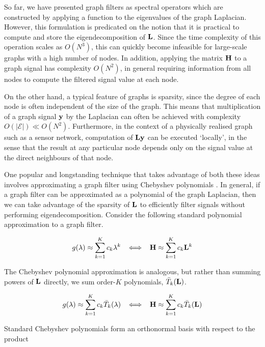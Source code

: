 \label{sec:Chebyshev}

So far, we have presented graph filters as spectral operators which are constructed by applying a function to the eigenvalues of the graph Laplacian. However, this formulation is predicated on the notion that it is practical to compute and store the eigendecomposition of $\mathbf{L}$. Since the time complexity of this operation scales as $O(N^3)$, this can quickly become infeasible for large-scale graphs with a high number of nodes. In addition, applying the matrix $\mathbf{H}$ to a graph signal has complexity $O(N^2)$, in general requiring information from all nodes to compute the filtered signal value at each node. 

On the other hand, a typical feature of graphs is sparsity, since the degree of each node is often independent of the size of the graph. This means that multiplication of a graph signal $\mathbf{y}$ by the Laplacian can often be achieved with complexity $O(|\mathcal{E}|) \ll O(N^2)$. Furthermore, in the context of a physically realised graph such as a sensor network, computation of $\mathbf{L} \mathbf{y}$ can be executed `locally', in the sense that the result at any particular node depends only on the signal value at the direct neighbours of that node. 

One popular and longstanding technique that takes advantage of both these ideas involves approximating a graph filter using Chebyshev polynomials \citep{Shuman2018}. In general, if a graph filter can be approximated as a polynomial of the graph Laplacian, then we can take advantage of the sparsity of $\mathbf{L}$ to efficiently filter signals without performing eigendecomposition. Consider the following standard polynomial approximation to a graph filter. 

\begin{equation}
    \label{eq:poly_lap}
    g(\lambda) \approx \sum_{k=1}^K c_k \lambda^k \;\; \iff \;\; \mathbf{H} \approx \sum_{k=1}^K c_k \mathbf{L}^k
\end{equation}

The Chebyshev polynomial approximation is analogous, but rather than summing powers of $\mathbf{L}$ directly, we sum order-$K$ polynomials, $\bar{T}_k(\mathbf{L})$. 

\begin{equation}
    \label{eq:cheb_lap}
    g(\lambda) \approx \sum_{k=1}^K c_k \bar{T}_k(\lambda) \;\; \iff \;\; \mathbf{H} \approx \sum_{k=1}^K c_k \bar{T}_k(\mathbf{L})
\end{equation}

Standard Chebyshev polynomials form an orthonormal basis with respect to the product

